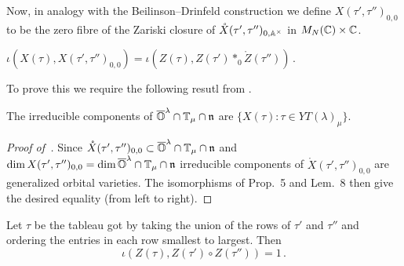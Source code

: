 \documentclass{article} %
\begin{document}
Now, in analogy with the Beilinson--Drinfeld construction 
we define $X(\tau', \tau'')_{0,0} $ to be the zero fibre of the Zariski closure of $\mathring X(\tau',\tau'')_{0,\AA^\times}$ in $M_N(\CC)\times\CC$. 
% 
\begin{corollary}
\label{cor:iota}
    $\iota(X(\tau), X(\tau',\tau'')_{0,0}) = \iota( Z(\tau), Z(\tau')\ast_0 \mathring Z(\tau''))\,.$
\end{corollary}
%

To prove this we require the following resutl from \cite{dthesis}.
\begin{theorem}
    \label{pr:govsasirrecs}
    The irreducible components of $\overline{\OO}^\lambda\cap\TT_\mu\cap\n$ are $\{{X(\tau)} : \tau\in YT(\lambda)_\mu\}$. 
\end{theorem}
% 
\begin{proof}[Proof of~]
Since $\mathring X(\tau',\tau'')_{0,0}\subset\overline{\OO}^\lambda\cap\TT_\mu\cap\n$ and $\dim X(\tau',\tau'')_{0,0} = \dim \overline{\OO}^\lambda\cap\TT_\mu\cap\n$  irreducible components of $\mathring X(\tau',\tau'')_{0,0}$ are generalized orbital varieties. The isomorphisms of Prop.\ 5 and Lem.\ 8 then give the desired equality (from left to right). 
\end{proof}
% 
\begin{conjecture}
    Let $\tau$ be the tableau got by taking the union of the rows of $\tau'$ and $\tau''$ and ordering the entries in each row smallest to largest. 
    Then 
    \begin{equation}
        \iota(Z(\tau), Z(\tau') \circ Z(\tau'')) = 1 \,. 
    \end{equation}
\end{conjecture}
% 
% 
% 
\end{document}
